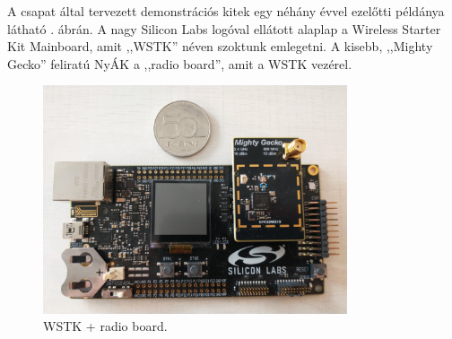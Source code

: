         \par
        A csapat által tervezett demonstrációs kitek egy néhány évvel ezelőtti példánya látható . ábrán. A nagy Silicon Labs logóval ellátott alaplap a Wireless Starter Kit Mainboard, amit ,,WSTK'' néven szoktunk emlegetni. A kisebb, ,,Mighty Gecko'' feliratú NyÁK a ,,radio board'', amit a WSTK vezérel.
            \begin{figure}
                \centering
                \includegraphics[width=0.8\textwidth]{kep/szerkesztett/wstk-mighty-gecko-nagy.jpg}
                \caption{WSTK + radio board.}
                \label{fig:wstkmighty}
            \end{figure}
